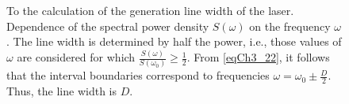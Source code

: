 \begin{figure}
\centering



\caption{To the calculation of the generation line width of the laser. Dependence of the spectral power density $S\left(\omega\right)$ on the frequency $\omega$. The line width is determined by half the power, i.e., those values of $\omega$ are considered for which $\frac{S(\omega)}{S(\omega_0)} \ge \frac{1}{2}$. From \eqref{eqCh3_22}, it follows that the interval boundaries correspond to frequencies $\omega = \omega_0 \pm \frac{D}{2}$. Thus, the line width is $D$.}
\label{figPart2Ch1_8}
\end{figure}